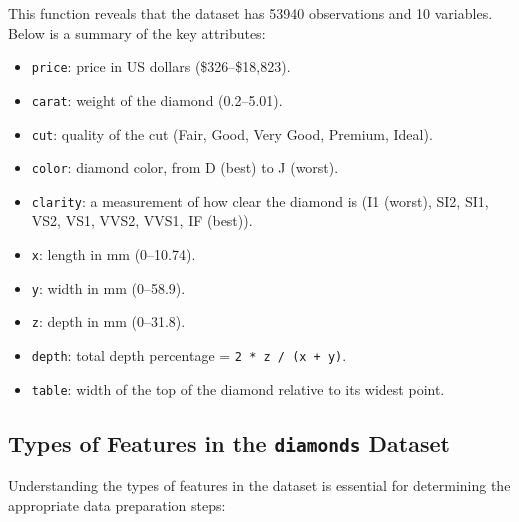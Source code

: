 \documentclass[
  11pt,
]{book}
\newcommand{\passthrough}[1]{#1}
\providecommand{\tightlist}{%
  \setlength{\itemsep}{0pt}\setlength{\parskip}{0pt}}
\theoremstyle{definition}
\theoremstyle{definition}
\theoremstyle{definition}
\theoremstyle{definition}
\theoremstyle{remark}
\begin{document}
This function reveals that the dataset has 53940 observations and 10 variables. Below is a summary of the key attributes:

\begin{itemize}
\tightlist
\item
  \passthrough{\lstinline!price!}: price in US dollars (\$326--\$18,823).
\item
  \passthrough{\lstinline!carat!}: weight of the diamond (0.2--5.01).
\item
  \passthrough{\lstinline!cut!}: quality of the cut (Fair, Good, Very Good, Premium, Ideal).
\item
  \passthrough{\lstinline!color!}: diamond color, from D (best) to J (worst).
\item
  \passthrough{\lstinline!clarity!}: a measurement of how clear the diamond is (I1 (worst), SI2, SI1, VS2, VS1, VVS2, VVS1, IF (best)).
\item
  \passthrough{\lstinline!x!}: length in mm (0--10.74).
\item
  \passthrough{\lstinline!y!}: width in mm (0--58.9).
\item
  \passthrough{\lstinline!z!}: depth in mm (0--31.8).
\item
  \passthrough{\lstinline!depth!}: total depth percentage = \passthrough{\lstinline!2 * z / (x + y)!}.
\item
  \passthrough{\lstinline!table!}: width of the top of the diamond relative to its widest point.
\end{itemize}

\subsection*{\texorpdfstring{Types of Features in the \texttt{diamonds} Dataset}{Types of Features in the diamonds Dataset}}\label{types-of-features-in-the-diamonds-dataset}


Understanding the types of features in the dataset is essential for determining the appropriate data preparation steps:
\end{document}
